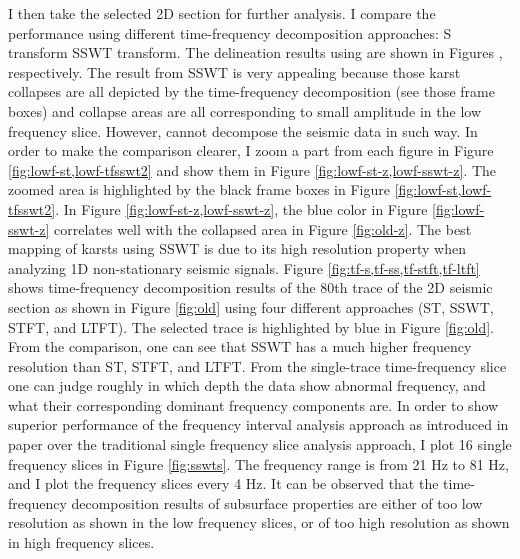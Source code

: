 I then take the selected 2D section for further analysis. I compare the performance using  different time-frequency decomposition approaches:  S transform SSWT transform.  The delineation results using  are shown in Figures , respectively. The result from SSWT is very appealing because those karst collapses are all depicted by the time-frequency decomposition (see those  frame boxes)\new{,} and  collapse areas are all corresponding to small amplitude in the low frequency slice. However,  cannot decompose the seismic data in such way.  In order to make the comparison clearer, I zoom a part from each figure in Figure \ref{fig:lowf-st,lowf-tfsswt2} and show them in Figure \ref{fig:lowf-st-z,lowf-sswt-z}. The zoomed area is highlighted by the black frame boxes in Figure \ref{fig:lowf-st,lowf-tfsswt2}. In Figure \ref{fig:lowf-st-z,lowf-sswt-z}, the blue color in Figure \ref{fig:lowf-sswt-z} correlates well with the collapsed area in Figure \ref{fig:old-z}. The best mapping of karsts using SSWT is due to its high resolution property when analyzing 1D non-stationary seismic signals. Figure \ref{fig:tf-s,tf-ss,tf-stft,tf-ltft} shows time-frequency decomposition results of the 80th trace of the 2D seismic section as shown in Figure \ref{fig:old}\new{,} using four different approaches (ST, SSWT, STFT, and LTFT). The selected trace is highlighted by blue in Figure \ref{fig:old}.  From the comparison, one can see that SSWT has a much higher frequency resolution than ST, STFT, and LTFT. From the single-trace time-frequency slice one can judge roughly in which depth the data show abnormal frequency, and what their corresponding dominant frequency components are. In order to show superior performance of the frequency interval analysis approach as introduced in  paper\new{,} over the traditional single frequency slice analysis approach, I plot 16 single frequency slices in Figure \ref{fig:sswts}. The frequency range is from 21 Hz to 81 Hz, and I plot the frequency slices every 4 Hz. It can be observed that the time-frequency decomposition results of subsurface properties are either of too low resolution\new{,} as shown in the low frequency slices, or of too high resolution as shown in high frequency slices.  


